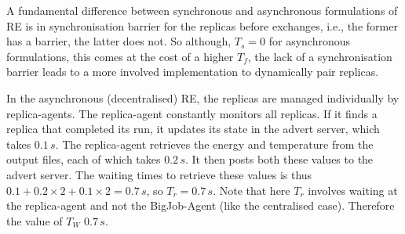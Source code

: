 \documentclass{rspublic}
\newcommand{\alnote}[1]{ {\textcolor{blue} { ***andre: #1 }}}
\newcommand{\athotanote}[1]{ {\textcolor{green} { ***athota: #1 }}}
\newcommand{\alnote}[1]{}
\newcommand{\athotanote}[1]{}
\begin{document}
A fundamental difference between synchronous and asynchronous
formulations of RE is in synchronisation barrier for the replicas
before exchanges, i.e., the former has a barrier, the latter does not.
So although, $T_s = 0$ for asynchronous formulations, this comes at
the cost of a higher $T_f$, the lack of a synchronisation barrier
leads to a more involved implementation to dynamically pair replicas.

In the asynchronous (decentralised) RE, the replicas are managed
individually by replica-agents. The replica-agent constantly monitors
all replicas. If it finds a replica that completed its run, it updates
its state in the advert server, which takes $0.1\,s$.  The
replica-agent retrieves the energy and temperature from the output
files, each of which takes $0.2\,s$. It then posts both these values
to the advert server.  The waiting times to retrieve these values is
thus $0.1+0.2\times2+0.1\times2=0.7\,s$, so $T_r = 0.7\,s$.  Note that
here $T_r$ involves waiting at the replica-agent and not the 
BigJob-Agent (like the centralised case).  Therefore the value of $T_W$ 
$0.7\,s$.



\end{document}
